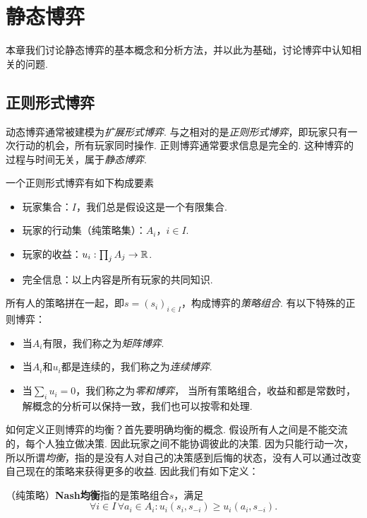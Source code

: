 \chapter{静态博弈}\label{chap:static-game}
本章我们讨论静态博弈的基本概念和分析方法，并以此为基础，讨论博弈中认知相关的问题. 

\section{正则形式博弈}
动态博弈通常被建模为\emph{扩展形式博弈}. 与之相对的是\emph{正则形式博弈}，即玩家只有一次行动的机会，所有玩家同时操作. 正则博弈通常要求信息是完全的. 这种博弈的过程与时间无关，属于\emph{静态博弈}.


一个正则形式博弈有如下构成要素
\begin{itemize}
    \item 玩家集合：$I$，我们总是假设这是一个有限集合.
    \item 玩家的行动集（纯策略集）：$A_i$，$i\in I$.
    \item 玩家的收益：$u_i:\prod_j A_j\to\mathbb{R}$.
    \item 完全信息：以上内容是所有玩家的共同知识.
\end{itemize}
所有人的策略拼在一起，即$s=(s_i)_{i\in I}$，构成博弈的\emph{策略组合}. 有以下特殊的正则博弈：
\begin{itemize}
    \item 当$A_i$有限，我们称之为\emph{矩阵博弈}.
    \item 当$A_i$和$u_i$都是连续的，我们称之为\emph{连续博弈}.
    \item 当$\sum_i u_i=0$，我们称之为\emph{零和博弈}，
    当所有策略组合，收益和都是常数时，解概念的分析可以保持一致，我们也可以按零和处理. 
\end{itemize}

如何定义正则博弈的均衡？首先要明确均衡的概念. 假设所有人之间是不能交流的，每个人独立做决策. 因此玩家之间不能协调彼此的决策. 因为只能行动一次，所以所谓\emph{均衡}，指的是没有人对自己的决策感到后悔的状态，没有人可以通过改变自己现在的策略来获得更多的收益. 因此我们有如下定义：

\begin{definition}[Nash均衡]
（纯策略）\textbf{Nash均衡}指的是策略组合$s$，满足
    \[\forall i\in I\,\forall a_i\in A_i:u_i(s_i,s_{-i})\geq u_i(a_i,s_{-i}).\]
\end{definition}

